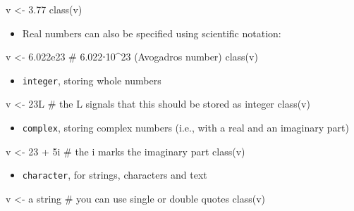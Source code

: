 \documentclass[
  letterpaper,
  DIV=11,
  numbers=noendperiod]{scrreprt}
\newenvironment{Shaded}{\begin{snugshade}}{\end{snugshade}}
\newcommand{\NormalTok}[1]{\textcolor[rgb]{0.00,0.23,0.31}{#1}}
\providecommand{\tightlist}{%
  \setlength{\itemsep}{0pt}\setlength{\parskip}{0pt}}\usepackage{longtable,booktabs,array}
\begin{document}
\begin{Shaded}
\begin{Highlighting}[]
\NormalTok{v \textless{}{-} 3.77}
\NormalTok{class(v)}
\end{Highlighting}
\end{Shaded}

\begin{itemize}
\tightlist
\item
  Real numbers can also be specified using scientific notation:
\end{itemize}

\begin{Shaded}
\begin{Highlighting}[]
\NormalTok{v \textless{}{-} 6.022e23 \# 6.022⋅10\^{}23 (Avogadro\textquotesingle{}s number)}
\NormalTok{class(v)}
\end{Highlighting}
\end{Shaded}

\begin{itemize}
\tightlist
\item
  \texttt{integer}, storing whole numbers
\end{itemize}

\begin{Shaded}
\begin{Highlighting}[]
\NormalTok{v \textless{}{-} 23L \# the L signals that this should be stored as integer}
\NormalTok{class(v)}
\end{Highlighting}
\end{Shaded}

\begin{itemize}
\tightlist
\item
  \texttt{complex}, storing complex numbers (i.e., with a real and an
  imaginary part)
\end{itemize}

\begin{Shaded}
\begin{Highlighting}[]
\NormalTok{v \textless{}{-} 23 + 5i \# the i marks the imaginary part}
\NormalTok{class(v)}
\end{Highlighting}
\end{Shaded}

\begin{itemize}
\tightlist
\item
  \texttt{character}, for strings, characters and text
\end{itemize}

\begin{Shaded}
\begin{Highlighting}[]
\NormalTok{v \textless{}{-} \textquotesingle{}a string\textquotesingle{} \# you can use single or double quotes}
\NormalTok{class(v)}
\end{Highlighting}
\end{Shaded}
\end{document}
